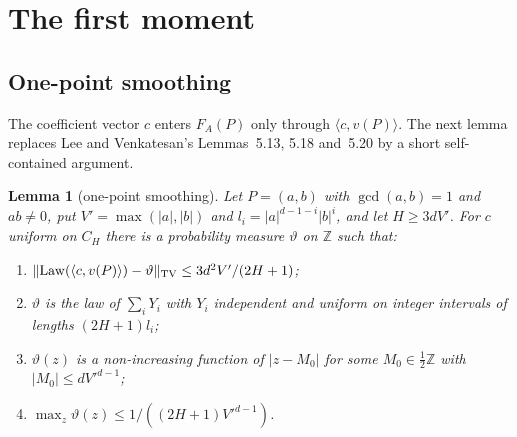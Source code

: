\documentclass[11pt]{amsart}
\newtheorem{lemma}[theorem]{Lemma}
\theoremstyle{definition}
\newcommand{\Z}{\mathbb{Z}}
\begin{document}
\section{The first moment}\label{sec:FM}

\subsection{One-point smoothing}
The coefficient vector $c$ enters $F_A(P)$ only through $\langle c,v(P)\rangle$. The next lemma replaces Lee and
Venkatesan's Lemmas~5.13, 5.18 and~5.20 \cite{lv2018} by a short self-contained argument.

\begin{lemma}[one-point smoothing]\label{lem:smooth1}
Let $P=(a,b)$ with $\gcd(a,b)=1$ and $ab\ne0$, put $V'=\max(|a|,|b|)$ and $l_i=|a|^{d-1-i}|b|^i$, and let $H\ge3dV'$. For $c$ uniform on
$C_H$ there is a probability measure $\vartheta$ on $\Z$ such that:
\begin{enumerate}[label=(\alph*)]
\item $\|\mathrm{Law}(\langle c,v(P)\rangle)-\vartheta\|_{\rm TV}\le3d^2V'/(2H+1)$;
\item $\vartheta$ is the law of $\sum_iY_i$ with $Y_i$ independent and uniform on integer intervals of lengths $(2H+1)l_i$;
\item $\vartheta(z)$ is a non-increasing function of $|z-M_0|$ for some $M_0\in\frac12\Z$ with $|M_0|\le dV'^{d-1}$;
\item $\max_z\vartheta(z)\le1/((2H+1)V'^{d-1})$.
\end{enumerate}
\end{lemma}
\end{document}
